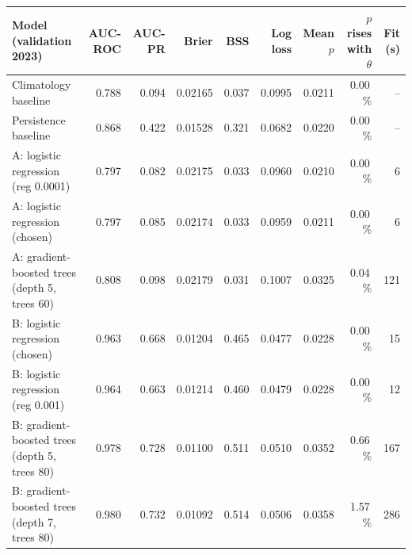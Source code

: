\begin{tabular}{lrrrrrrrr}
\toprule
Model (validation 2023) & AUC-ROC & AUC-PR & Brier & BSS & Log loss & Mean $p$ & $p$ rises with $\theta$ & Fit (s) \\
\midrule
Climatology baseline & 0.788 & 0.094 & 0.02165 & 0.037 & 0.0995 & 0.0211 & 0.00\,\% & -- \\
Persistence baseline & 0.868 & 0.422 & 0.01528 & 0.321 & 0.0682 & 0.0220 & 0.00\,\% & -- \\
A: logistic regression (reg 0.0001) & 0.797 & 0.082 & 0.02175 & 0.033 & 0.0960 & 0.0210 & 0.00\,\% & 6 \\
A: logistic regression (chosen) & 0.797 & 0.085 & 0.02174 & 0.033 & 0.0959 & 0.0211 & 0.00\,\% & 6 \\
A: gradient-boosted trees (depth 5, trees 60) & 0.808 & 0.098 & 0.02179 & 0.031 & 0.1007 & 0.0325 & 0.04\,\% & 121 \\
B: logistic regression (chosen) & 0.963 & 0.668 & 0.01204 & 0.465 & 0.0477 & 0.0228 & 0.00\,\% & 15 \\
B: logistic regression (reg 0.001) & 0.964 & 0.663 & 0.01214 & 0.460 & 0.0479 & 0.0228 & 0.00\,\% & 12 \\
B: gradient-boosted trees (depth 5, trees 80) & 0.978 & 0.728 & 0.01100 & 0.511 & 0.0510 & 0.0352 & 0.66\,\% & 167 \\
B: gradient-boosted trees (depth 7, trees 80) & 0.980 & 0.732 & 0.01092 & 0.514 & 0.0506 & 0.0358 & 1.57\,\% & 286 \\
\bottomrule
\end{tabular}
